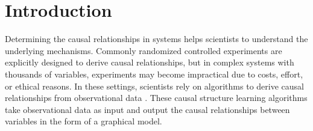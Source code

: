 \chapter{Introduction}
Determining the causal relationships in systems helps scientists to understand the underlying mechanisms. Commonly randomized controlled experiments are explicitly designed to derive causal relationships, but in complex systems with thousands of variables, experiments may become impractical due to costs, effort, or ethical reasons. In these settings, scientists rely on algorithms to derive causal relationships from observational data \cite{pearlCausality2009,spirtesCausationPredictionSearch1993,neapolitanLearningBayesianNetworks2003,pearlProbabilisticReasoningIntelligent1988}. 
These causal structure learning algorithms take observational data as input and output the causal relationships between variables in the form of a graphical model.

